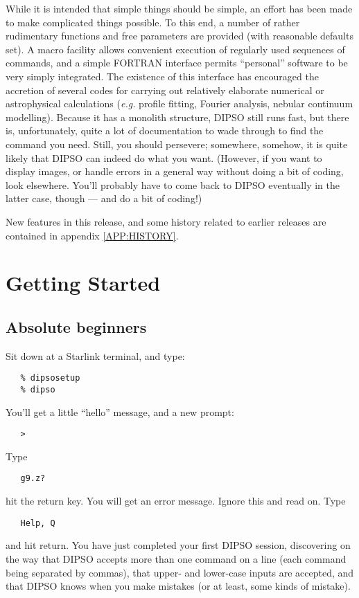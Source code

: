 \documentclass[twoside,11pt]{article}
\newcommand{\hyperref}[4]{#2\ref{#4}#3}
\renewcommand{\_}{\texttt{\symbol{95}}}
\begin{document}
While it is intended that simple things should be simple, an effort
has been made to make complicated things possible. To this end, a
number of rather rudimentary functions and free parameters are
provided (with reasonable defaults set). A macro facility allows
convenient execution of regularly used sequences of commands, and a
simple FORTRAN interface permits ``personal'' software to be very
simply integrated. The existence of this interface has encouraged the
accretion of several codes for carrying out relatively elaborate
numerical or astrophysical calculations ({\em e.g.} profile fitting,
Fourier analysis, nebular continuum modelling). Because it has a
monolith structure, DIPSO still runs fast, but there is,
unfortunately, quite a lot of documentation to wade through to find
the command you need. Still, you should persevere; somewhere, somehow,
it is quite likely that DIPSO can indeed do what you want. (However,
if you want to display images, or handle errors in a general way
without doing a bit of coding, look elsewhere. You'll probably have to
come back to DIPSO eventually in the latter case, though --- and do a
bit of coding!)

New features in this release, and some history related to earlier releases
are \hyperref{described here}{contained in appendix }{}{APP:HISTORY}.


\section {Getting Started}

\subsection {Absolute beginners}
Sit down at a Starlink terminal, and type:
\begin{verbatim}
   % dipsosetup
   % dipso
\end{verbatim}

You'll get a little ``hello'' message, and a new prompt:
\begin{verbatim}
   >
\end{verbatim}
Type
\begin{verbatim}
   g9.z?
\end{verbatim}
hit the return key. You will get an error message. Ignore this and 
read on. Type
\begin{verbatim}
   Help, Q
\end{verbatim}

and hit return. You have just completed your first DIPSO session,
discovering on the way that DIPSO accepts more than one command on a
line (each command being separated by commas), that upper- and
lower-case inputs are accepted, and that DIPSO knows when you make
mistakes (or at least, some kinds of mistake).
\end{document}
